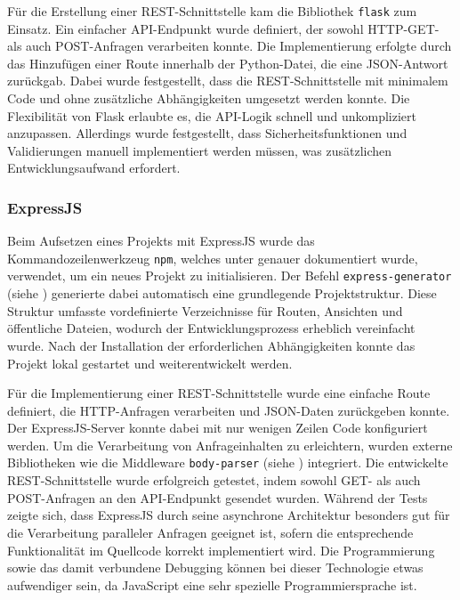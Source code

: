 Für die Erstellung einer REST-Schnittstelle kam die Bibliothek \texttt{flask} zum Einsatz. Ein einfacher API-Endpunkt wurde definiert, der sowohl HTTP-GET- als auch POST-Anfragen verarbeiten konnte. Die Implementierung erfolgte durch das Hinzufügen einer Route innerhalb der Python-Datei, die eine JSON-Antwort zurückgab. Dabei wurde festgestellt, dass die REST-Schnittstelle mit minimalem Code und ohne zusätzliche Abhängigkeiten umgesetzt werden konnte. Die Flexibilität von Flask erlaubte es, die API-Logik schnell und unkompliziert anzupassen. Allerdings wurde festgestellt, dass Sicherheitsfunktionen und Validierungen manuell implementiert werden müssen, was zusätzlichen Entwicklungsaufwand erfordert.


\subsubsection{ExpressJS}

Beim Aufsetzen eines Projekts mit ExpressJS wurde das Kommandozeilenwerkzeug \texttt{npm}, welches unter \cite{website-npm} genauer dokumentiert wurde, verwendet, um ein neues Projekt zu initialisieren. Der Befehl \texttt{express-generator} (siehe \cite{website-expressjs-generator}) generierte dabei automatisch eine grundlegende Projektstruktur. Diese Struktur umfasste vordefinierte Verzeichnisse für Routen, Ansichten und öffentliche Dateien, wodurch der Entwicklungsprozess erheblich vereinfacht wurde. Nach der Installation der erforderlichen Abhängigkeiten konnte das Projekt lokal gestartet und weiterentwickelt werden.

Für die Implementierung einer REST-Schnittstelle wurde eine einfache Route definiert, die HTTP-Anfragen verarbeiten und JSON-Daten zurückgeben konnte. Der ExpressJS-Server konnte dabei mit nur wenigen Zeilen Code konfiguriert werden. Um die Verarbeitung von Anfrageinhalten zu erleichtern, wurden externe Bibliotheken wie die Middleware \texttt{body-parser} (siehe \cite{website-expressjs-body-parser-lib}) integriert. Die entwickelte REST-Schnittstelle wurde erfolgreich getestet, indem sowohl GET- als auch POST-Anfragen an den API-Endpunkt gesendet wurden. Während der Tests zeigte sich, dass ExpressJS durch seine asynchrone Architektur besonders gut für die Verarbeitung paralleler Anfragen geeignet ist, sofern die entsprechende Funktionalität im Quellcode korrekt implementiert wird. Die Programmierung sowie das damit verbundene Debugging können bei dieser Technologie etwas aufwendiger sein, da JavaScript eine sehr spezielle Programmiersprache ist.


